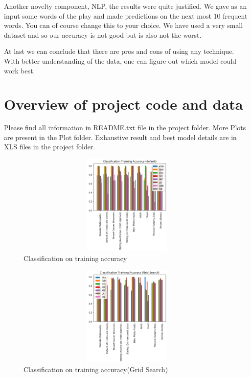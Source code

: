 \documentclass[10pt,twocolumn,letterpaper]{article}
\begin{document}
 Another novelty component, NLP, the results were quite justified. We gave as an input some words of the play and made predictions on the next most 10 frequent words. You can of course change this to your choice. We have used a very small dataset and so our accuracy is not good but is also not the worst. 

 At last we can conclude that there are pros and cons of using any technique. With better understanding of the data, one can figure out which model could work best.
 
 \section{Overview of project code and data}
Please find all information in README.txt file in the project folder. More Plots are present in the Plot folder. Exhaustive result and best model details are in XLS files in the project  folder.
\newpage

\begin{figure}
   \begin{center}
   \includegraphics[width=15cm,height=5cm,keepaspectratio]{Classification Training Accuracy (default).png}
   \end{center}
      \caption{Classification on training accuracy\label{Classification training accuracy}}
\end{figure}

\begin{figure}
   \begin{center}
   \includegraphics[width=15cm,height=5cm,keepaspectratio]{Classification Training Accuracy (Grid Search).png}
   \end{center}
      \caption{Classification on training accuracy(Grid Search)\label{Classification training accuracy}}
\end{figure}
\end{document}
